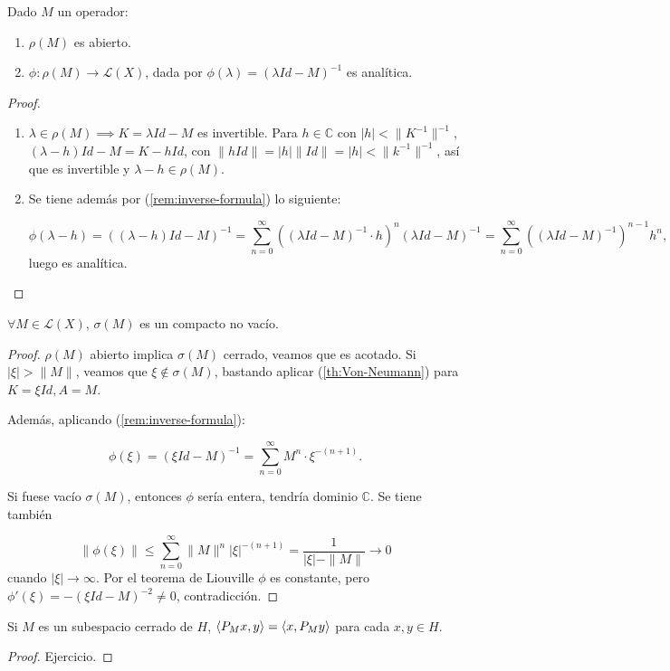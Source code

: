 \begin{theorem}
  Dado $M$ un operador:
  \begin{enumerate}
    \item $\rho(M)$ es abierto.
    \item $\phi:\rho(M)\to  \mathcal{L}(X)$, dada por $\phi(\lambda)=(\lambda
      Id-M)^{-1}$ es analítica.
  \end{enumerate}
\end{theorem}

\begin{proof}
  \begin{enumerate}
    \item $\lambda\in \rho(M)\implies K=\lambda Id-M$ es invertible. Para $h\in
      \mathbb{C}$ con $|h|<\|K^{-1}\|^{-1}$, $(\lambda-h)Id-M=K-hId$, con
      $\|hId\|=|h|\|Id\|=|h|<\|k^{-1}\|^{-1}$, así que es invertible y
      $\lambda-h\in \rho(M)$.
    \item Se tiene además por (\ref{rem:inverse-formula}) lo siguiente:

      \[
        \phi(\lambda-h)=((\lambda-h)Id-M)^{-1}=\sum_{n=0}^{\infty} ((\lambda Id-M)^{-1}\cdot
        h)^n(\lambda Id-M)^{-1}=\sum_{n=0}^{\infty} ((\lambda
        Id-M)^{-1})^{n-1}h^n
      ,\] 
      luego es analítica.
  \end{enumerate}
\end{proof}

\begin{theorem}[Gelfand]
  $\forall M\in \mathcal{L}(X)$, $\sigma(M)$ es un compacto no vacío.
\end{theorem}

\begin{proof}
  $\rho(M)$ abierto implica $\sigma(M)$ cerrado, veamos que es acotado. Si
  $|\xi|> \|M\|$, veamos que $\xi \not\in \sigma(M)$, bastando aplicar
  (\ref{th:Von-Neumann}) para $K=\xi  Id, A=M$.

  Además, aplicando (\ref{rem:inverse-formula}):

  \[
    \phi(\xi )=(\xi Id-M)^{-1}=\sum_{n=0}^{\infty} M^n\cdot \xi^{-(n+1)}
  .\] 

  Si fuese vacío $\sigma(M)$, entonces $\phi$ sería entera, tendría dominio
  $\mathbb{C}$. Se tiene también

  \[
  \|\phi(\xi)\|\le \sum_{n=0}^{\infty} \|M\|^n |\xi|^{-(n+1)}=
  \frac{1}{|\xi|-\|M\|}\to 0
  \] 
  cuando $|\xi|\to \infty$. Por el teorema de Liouville $\phi$ es
  constante, pero $\phi'(\xi)=-(\xi Id - M)^{-2} \neq 0$, contradicción.
\end{proof}

\begin{proposition}
  Si $M$ es un subespacio cerrado de  $H$, $\left\langle P_Mx,y\right\rangle=\left\langle x,P_My\right\rangle$ para
  cada $x,y\in H$.
\end{proposition}

\begin{proof}
  Ejercicio.
\end{proof}

